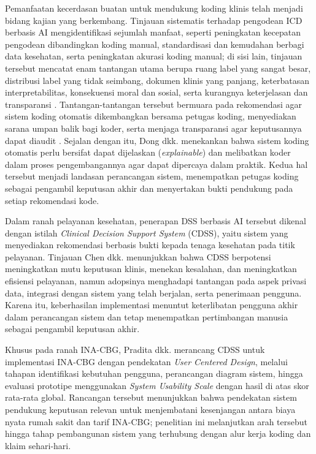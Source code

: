 Pemanfaatan kecerdasan buatan untuk mendukung koding klinis telah menjadi bidang kajian yang berkembang. Tinjauan sistematis terhadap pengodean ICD berbasis AI mengidentifikasi sejumlah manfaat, seperti peningkatan kecepatan pengodean dibandingkan koding manual, standardisasi dan kemudahan berbagi data kesehatan, serta peningkatan akurasi koding manual; di sisi lain, tinjauan tersebut mencatat enam tantangan utama berupa ruang label yang sangat besar, distribusi label yang tidak seimbang, dokumen klinis yang panjang, keterbatasan interpretabilitas, konsekuensi moral dan sosial, serta kurangnya keterjelasan dan transparansi \cite{17}. Tantangan-tantangan tersebut bermuara pada rekomendasi agar sistem koding otomatis dikembangkan bersama petugas koding, menyediakan sarana umpan balik bagi koder, serta menjaga transparansi agar keputusannya dapat diaudit \cite{17}. Sejalan dengan itu, Dong dkk. \cite{6} menekankan bahwa sistem koding otomatis perlu bersifat dapat dijelaskan (\textit{explainable}) dan melibatkan koder dalam proses pengembangannya agar dapat dipercaya dalam praktik. Kedua hal tersebut menjadi landasan perancangan sistem, menempatkan petugas koding sebagai pengambil keputusan akhir dan menyertakan bukti pendukung pada setiap rekomendasi kode.

Dalam ranah pelayanan kesehatan, penerapan DSS berbasis AI tersebut dikenal dengan istilah \textit{Clinical Decision Support System} (CDSS), yaitu sistem yang menyediakan rekomendasi berbasis bukti kepada tenaga kesehatan pada titik pelayanan. Tinjauan Chen dkk. \cite{5} menunjukkan bahwa CDSS berpotensi meningkatkan mutu keputusan klinis, menekan kesalahan, dan meningkatkan efisiensi pelayanan, namun adopsinya menghadapi tantangan pada aspek privasi data, integrasi dengan sistem yang telah berjalan, serta penerimaan pengguna. Karena itu, keberhasilan implementasi menuntut keterlibatan pengguna akhir dalam perancangan sistem dan tetap menempatkan pertimbangan manusia sebagai pengambil keputusan akhir.

Khusus pada ranah INA-CBG, Pradita dkk. \cite{18} merancang CDSS untuk implementasi INA-CBG dengan pendekatan \textit{User Centered Design}, melalui tahapan identifikasi kebutuhan pengguna, perancangan diagram sistem, hingga evaluasi prototipe menggunakan \textit{System Usability Scale} dengan hasil di atas skor rata-rata global. Rancangan tersebut menunjukkan bahwa pendekatan sistem pendukung keputusan relevan untuk menjembatani kesenjangan antara biaya nyata rumah sakit dan tarif INA-CBG; penelitian ini melanjutkan arah tersebut hingga tahap pembangunan sistem yang terhubung dengan alur kerja koding dan klaim sehari-hari.

